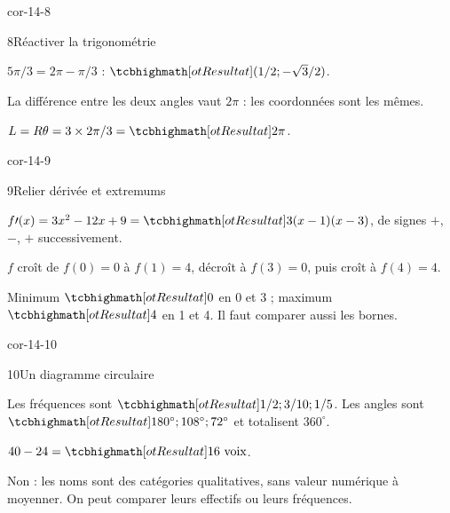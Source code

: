 \begin{blocLivre}{cor-14-8}
\begin{corrige}{8}{Réactiver la trigonométrie}
\begin{questions}
\item $5\pi/3=2\pi-\pi/3$ : $\res{(1/2;-\sqrt3/2)}$.
\item La différence entre les deux angles vaut $2\pi$ : les coordonnées sont les mêmes.
\item $L=R\theta=3\times2\pi/3=\res{2\pi}$.
\end{questions}
\label{figlivre-r14-08-trigo-cor}

\end{corrige}
\end{blocLivre}
\begin{blocLivre}{cor-14-9}
\begin{corrige}{9}{Relier dérivée et extremums}
\begin{questions}
\item $f\prime(x)=3x^2-12x+9=\res{3(x-1)(x-3)}$, de signes $+$, $-$, $+$ successivement.
\item $f$ croît de $f(0)=0$ à $f(1)=4$, décroît à $f(3)=0$, puis croît à $f(4)=4$.
\item Minimum $\res{0}$ en 0 et 3 ; maximum $\res{4}$ en 1 et 4. Il faut comparer aussi les bornes.
\end{questions}
\label{figlivre-r14-09-var-cor}

\end{corrige}
\end{blocLivre}
\begin{blocLivre}{cor-14-10}
\begin{corrige}{10}{Un diagramme circulaire}
\begin{questions}
\item Les fréquences sont $\res{1/2;3/10;1/5}$. Les angles sont $\res{180^\circ;108^\circ;72^\circ}$ et totalisent $360^\circ$.
\item $40-24=\res{16\text{ voix}}$.
\item Non : les noms sont des catégories qualitatives, sans valeur numérique à moyenner. On peut comparer leurs effectifs ou leurs fréquences.
\end{questions}
\label{figlivre-r14-10-secteurs-cor}

\end{corrige}
\end{blocLivre}
